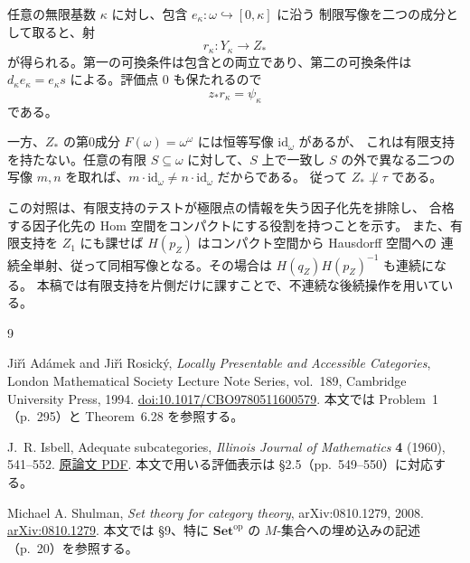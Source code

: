 \documentclass[a4paper,11pt]{ltjsarticle}
\theoremstyle{japaneseplain}
\newcommand{\Set}{\mathbf{Set}}
\newcommand{\id}{\mathrm{id}}
\newcommand{\op}{\mathrm{op}}
\begin{document}
任意の無限基数 $\kappa$ に対し、包含 $e_\kappa:\omega\hookrightarrow[0,\kappa]$ に沿う
制限写像を二つの成分として取ると、射
\[
 r_\kappa:Y_\kappa\longrightarrow Z_*
\]
が得られる。第一の可換条件は包含との両立であり、第二の可換条件は
$d_\kappa e_\kappa=e_\kappa s$ による。評価点 $0$ も保たれるので
\[
 z_*r_\kappa=\psi_\kappa
\]
である。

一方、$Z_*$ の第0成分 $F(\omega)=\omega^\omega$ には恒等写像 $\id_\omega$ があるが、
これは有限支持を持たない。任意の有限 $S\subseteq\omega$ に対して、$S$ 上で一致し
$S$ の外で異なる二つの写像 $m,n$ を取れば、$m\cdot\id_\omega\ne n\cdot\id_\omega$ だからである。
従って $Z_*\not\perp\tau$ である。

この対照は、有限支持のテストが極限点の情報を失う因子化先を排除し、
合格する因子化先の Hom 空間をコンパクトにする役割を持つことを示す。
また、有限支持を $Z_1$ にも課せば $H(p_Z)$ はコンパクト空間から Hausdorff 空間への
連続全単射、従って同相写像となる。その場合は $H(q_Z)H(p_Z)^{-1}$ も連続になる。
本稿では有限支持を片側だけに課すことで、不連続な後続操作を用いている。

\begin{thebibliography}{9}

Ji\v r\'{\i} Ad\'{a}mek and Ji\v r\'{\i} Rosick\'{y},
\emph{Locally Presentable and Accessible Categories},
London Mathematical Society Lecture Note Series, vol.~189,
Cambridge University Press, 1994.
\href{https://doi.org/10.1017/CBO9780511600579}{doi:10.1017/CBO9780511600579}.
本文では Problem~1（p.~295）と Theorem~6.28 を参照する。

J.~R. Isbell,
Adequate subcategories,
\emph{Illinois Journal of Mathematics} \textbf{4} (1960), 541--552.
\href{https://conceptualmathematics.wordpress.com/wp-content/uploads/2013/05/adequatesubcategories.pdf}{原論文 PDF}.
本文で用いる評価表示は \S2.5（pp.~549--550）に対応する。

Michael A. Shulman,
\emph{Set theory for category theory},
arXiv:0810.1279, 2008.
\href{https://arxiv.org/abs/0810.1279}{arXiv:0810.1279}.
本文では \S9、特に $\Set^{\op}$ の $M$-集合への埋め込みの記述（p.~20）を参照する。

\end{thebibliography}
\end{document}
